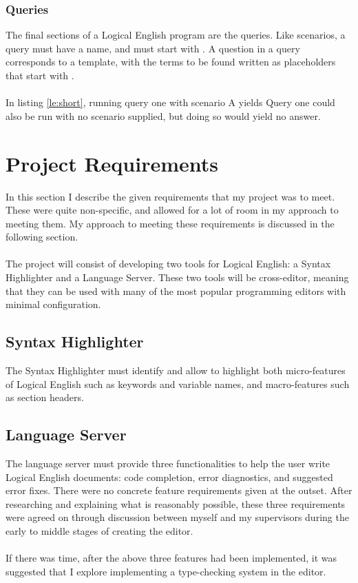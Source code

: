 \documentclass[../main.tex]{subfiles}
\begin{document}
\subsubsection{Queries}
The final sections of a Logical English program are the queries. Like scenarios, a query must have a name, and must start with . A question in a query corresponds to a template, with the terms to be found written as placeholders that start with . 
\\ \\ 
In listing \ref{le:short}, running query one with scenario A yields
 Query one could also be run with no scenario supplied, but doing so would yield no answer.

\newpage
\section{Project Requirements}
In this section I describe the given requirements that my project was to meet. These were quite non-specific, and allowed for a lot of room in my approach to meeting them. My approach to meeting these requirements is discussed in the following section.
\\
\\
The project will consist of developing two tools for Logical English: a Syntax Highlighter and a Language Server. These two tools will be cross-editor, meaning that they can be used with many of the most popular programming editors with minimal configuration.

\subsection{Syntax Highlighter}
The Syntax Highlighter must identify and allow to highlight both micro-features of Logical English such as keywords and variable names, and macro-features such as section headers.

\subsection{Language Server}
The language server must provide three functionalities to help the user write Logical English documents: code completion, error diagnostics, and suggested error fixes. There were no concrete feature requirements given at the outset. After researching and explaining what is reasonably possible, these three requirements were agreed on through discussion between myself and my supervisors during the early to middle stages of creating the editor. 
\\
\\
If there was time, after the above three features had been implemented, it was suggested that I explore implementing a type-checking system in the editor.
\end{document}
